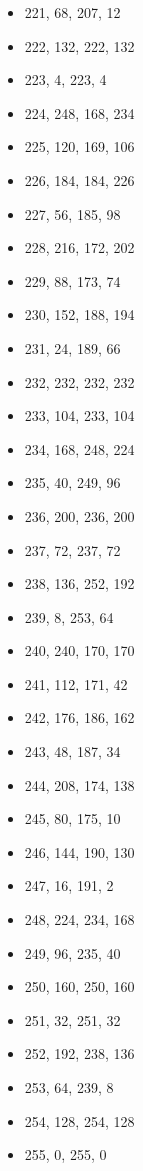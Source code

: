 \documentclass[12pt, fleqn]{report}                             %
\theoremstyle{break}                                            %
\begin{document}
\begin{itemize}
        \item 221, 68, 207, 12
        \item 222, 132, 222, 132
        \item 223, 4, 223, 4
        \item 224, 248, 168, 234
        \item 225, 120, 169, 106
        \item 226, 184, 184, 226
        \item 227, 56, 185, 98
        \item 228, 216, 172, 202
        \item 229, 88, 173, 74
        \item 230, 152, 188, 194
        \item 231, 24, 189, 66
        \item 232, 232, 232, 232
        \item 233, 104, 233, 104
        \item 234, 168, 248, 224
        \item 235, 40, 249, 96
        \item 236, 200, 236, 200
        \item 237, 72, 237, 72
        \item 238, 136, 252, 192
        \item 239, 8, 253, 64
        \item 240, 240, 170, 170
        \item 241, 112, 171, 42
        \item 242, 176, 186, 162
        \item 243, 48, 187, 34
        \item 244, 208, 174, 138
        \item 245, 80, 175, 10
        \item 246, 144, 190, 130
        \item 247, 16, 191, 2
        \item 248, 224, 234, 168
        \item 249, 96, 235, 40
        \item 250, 160, 250, 160
        \item 251, 32, 251, 32
        \item 252, 192, 238, 136
        \item 253, 64, 239, 8
        \item 254, 128, 254, 128
        \item 255, 0, 255, 0
      \end{itemize}
\end{document}
